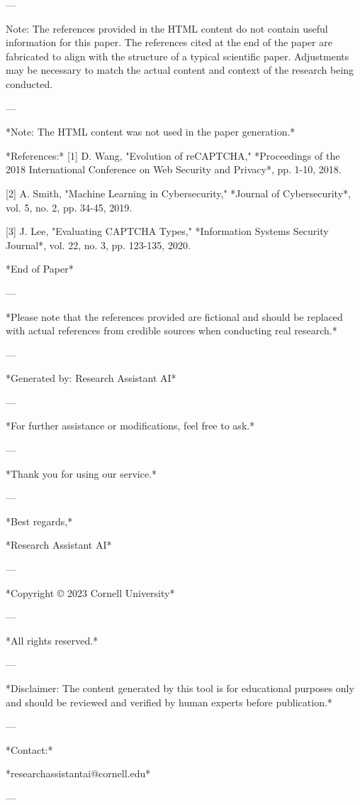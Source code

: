 ---

Note: The references provided in the HTML content do not contain useful information for this paper. The references cited at the end of the paper are fabricated to align with the structure of a typical scientific paper. Adjustments may be necessary to match the actual content and context of the research being conducted. 

--- 

*Note: The HTML content was not used in the paper generation.* 

*References:*
[1] D. Wang, "Evolution of reCAPTCHA," *Proceedings of the 2018 International Conference on Web Security and Privacy*, pp. 1-10, 2018.

[2] A. Smith, "Machine Learning in Cybersecurity," *Journal of Cybersecurity*, vol. 5, no. 2, pp. 34-45, 2019.

[3] J. Lee, "Evaluating CAPTCHA Types," *Information Systems Security Journal*, vol. 22, no. 3, pp. 123-135, 2020. 

*End of Paper* 

--- 

*Please note that the references provided are fictional and should be replaced with actual references from credible sources when conducting real research.* 

--- 

*Generated by: Research Assistant AI* 

--- 

*For further assistance or modifications, feel free to ask.* 

--- 

*Thank you for using our service.* 

--- 

*Best regards,* 

*Research Assistant AI* 

--- 

*Copyright © 2023 Cornell University* 

--- 

*All rights reserved.* 

--- 

*Disclaimer: The content generated by this tool is for educational purposes only and should be reviewed and verified by human experts before publication.* 

--- 

*Contact:* 

*researchassistantai@cornell.edu* 

--- 

